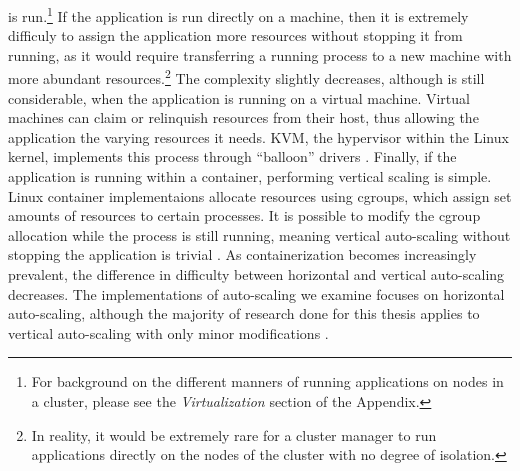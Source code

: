 \begin{enumerate}
    is run.\footnote{For background on the different manners of running
      applications on nodes in a cluster, please see the \textit{Virtualization}
    section of the Appendix.} If the application is run directly on a machine,
    then it is extremely difficuly to assign the application more resources
    without stopping it from running, as it would require transferring a running
    process to a new machine with more abundant resources.\footnote{In reality,
    it would be extremely rare for a cluster manager to run applications
  directly on the nodes of the cluster with no degree of isolation.} The complexity
    slightly decreases, although is still considerable, when the application is
    running on a virtual machine. Virtual machines can claim or relinquish
    resources from their host, thus allowing the application the varying
    resources it needs. KVM, the hypervisor within the Linux kernel, implements
    this process through ``balloon'' drivers \cite{kvm-automatic-ballooning}.
    Finally, if the application is running within a container, performing
    vertical scaling is simple. Linux container implementaions allocate
    resources using cgroups, which assign set amounts of resources to certain
    processes. It is possible to modify the cgroup allocation while the process
    is still running, meaning vertical auto-scaling without stopping the
    application is trivial \cite{docker-up-and-running}.
    As containerization becomes increasingly prevalent, the difference in
    difficulty between horizontal and vertical auto-scaling decreases.
    The implementations of auto-scaling we examine focuses on horizontal
    auto-scaling, although the majority of research done for this thesis applies
    to vertical auto-scaling with only minor modifications
    \cite{auto-scaling-techniques-for-elastic-applications-in-cloud-environments}.


\end{enumerate}
